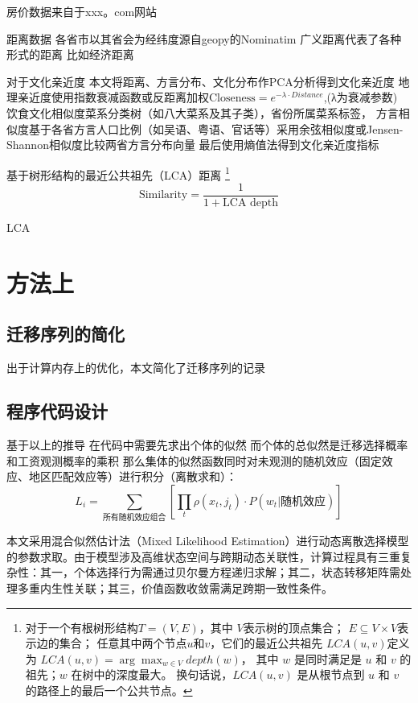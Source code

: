 \documentclass[a4paper,12pt,oneside, fontset=mac]{ctexbook} %
\begin{document}
房价数据来自于xxx。com网站

距离数据
各省市以其省会为经纬度源自geopy的Nominatim
广义距离代表了各种形式的距离 比如经济距离

对于文化亲近度
本文将距离、方言分布、文化分布作PCA分析得到文化亲近度
地理亲近度使用指数衰减函数或反距离加权$\text{Closeness}=e^ {-\lambda \cdot Distance}$,(λ为衰减参数)
饮食文化相似度菜系分类树（如八大菜系及其子类），省份所属菜系标签，
方言相似度基于各省方言人口比例（如吴语、粤语、官话等）采用余弦相似度或Jensen-Shannon相似度比较两省方言分布向量
最后使用熵值法得到文化亲近度指标

基于树形结构的最近公共祖先（LCA）距离
\footnote{
对于一个有根树形结构$T=(V,E)$，其中
$V$表示树的顶点集合；
$E\subseteq V \times V$表示边的集合；
任意其中两个节点$u$和$v$，它们的最近公共祖先 $LCA(u,v) $定义为
$LCA(u,v)=\arg \max_{w\in V} depth(w)$，
其中 $w$ 是同时满足是 $u$ 和 $v$ 的祖先；$w$ 在树中的深度最大。
换句话说，$LCA(u,v)$ 是从根节点到 $u$ 和 $v$ 的路径上的最后一个公共节点。
}
\begin{equation}
  \text{Similarity}=\frac{1}{1+\text{LCA depth}}
\end{equation}

LCA




\section{方法上} %
\label{sub:方法上}


\subsection{迁移序列的简化}

出于计算内存上的优化，本文简化了迁移序列的记录

\subsection{程序代码设计}
基于以上的推导
在代码中需要先求出个体的似然
而个体的总似然是迁移选择概率和工资观测概率的乘积
那么集体的似然函数同时对未观测的随机效应（固定效应、地区匹配效应等）进行积分（离散求和）：
\begin{equation}
  L_{i}=\sum\limits_{\text{所有随机效应组合}}[\prod_{t}\rho(x_{t},j_{t})\cdot P(w_{t}|\text{随机效应}) ]
\end{equation}

本文采用混合似然估计法（Mixed Likelihood Estimation）进行动态离散选择模型的参数求取。由于模型涉及高维状态空间与跨期动态关联性，计算过程具有三重复杂性：其一，个体选择行为需通过贝尔曼方程递归求解；其二，状态转移矩阵需处理多重内生性关联；其三，价值函数收敛需满足跨期一致性条件。
\end{document}
